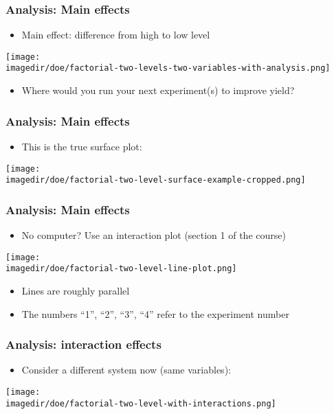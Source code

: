 \begin{frame}\frametitle{Analysis: Main effects}
	\begin{itemize}
		\item	Main effect: difference from high to low level
	\end{itemize}
	\begin{center}
		\texttt{[image: \\imagedir/doe/factorial-two-levels-two-variables-with-analysis.png]}
	\end{center}
	\begin{itemize}
		\item	Where would you run your next experiment(s) to improve yield?
	\end{itemize}
\end{frame}

\begin{frame}\frametitle{Analysis: Main effects}
	\begin{itemize}
		\item	This is the true surface plot:
	\end{itemize}
	\begin{center}
		\texttt{[image: \\imagedir/doe/factorial-two-level-surface-example-cropped.png]}
	\end{center}
\end{frame}

\begin{frame}\frametitle{Analysis: Main effects}
	\begin{itemize}
		\item	No computer? Use an interaction plot (section 1 of the course)
	\end{itemize}
	\begin{center}
		\texttt{[image: \\imagedir/doe/factorial-two-level-line-plot.png]}
	\end{center}
	\begin{itemize}
		\item	Lines are roughly parallel
		\item	The numbers ``1'', ``2'', ``3'', ``4'' refer to the experiment number
	\end{itemize}
\end{frame}

\begin{frame}\frametitle{Analysis: interaction effects}
	\begin{itemize}
		\item	Consider a different system now (same variables):
	\end{itemize}
	\begin{center}
		\texttt{[image: \\imagedir/doe/factorial-two-level-with-interactions.png]}
	\end{center}
\end{frame}

